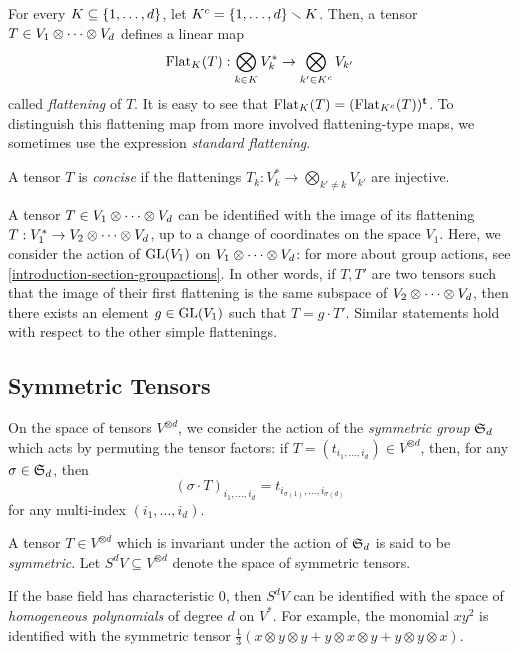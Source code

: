 \begin{definition}[Flattenings]
\label{introduction-definition-flattenings}
For every $K \subseteq \{1 , \ldots , d\}$, let $K^c = \{1, \ldots , d\} \smallsetminus K$. Then, a tensor $T \in V_1 \otimes \cdots \otimes V_d$ defines a linear map 
\[
    \mathrm{Flat}_K(T): \bigotimes_{k \in K} V_{k}^* \to  \bigotimes_{k' \in K^c} V_{k'}
\]
called \emph{flattening} of $T$. It is easy to see that $\mathrm{Flat}_K(T) = (\mathrm{Flat}_{K^c}(T))^{\mathbf{t}}$. To distinguish this flattening map from more involved flattening-type maps, we sometimes use the expression \emph{standard flattening}.
\end{definition}

\begin{definition}
\label{introduction-definition-concise}
A tensor $T$ is \emph{concise} if the flattenings $T_k : V_k^* \to \bigotimes_{k' \neq k} V_{k'}$ are injective. 
\end{definition}

A tensor $T \in V_1 \otimes \cdots \otimes V_d$ can be identified with the image of its flattening $T : V_1^* \to V_2 \otimes \cdots \otimes V_d$, up to a change of coordinates on the space $V_1$. Here, we consider the action of $\mathrm{GL}(V_1)$ on $V_1 \otimes \cdots \otimes V_d$: for more about group actions, see \ref{introduction-section-groupactions}. In other words, if $T,T'$ are two tensors such that the image of their first flattening is the same subspace of $V_2 \otimes \cdots \otimes V_d$, then there exists an element $g \in \mathrm{GL}(V_1)$ such that $T = g\cdot T'$. Similar statements hold with respect to the other simple flattenings.

\subsection{Symmetric Tensors}
\label{introduction-subsection-symmetric_tensors}

On the space of tensors $V^{\otimes d}$, we consider the action of the \emph{symmetric group} $\mathfrak{S}_d$ which acts by permuting the tensor factors: if $T = (t_{i_1,\ldots,i_d}) \in V^{\otimes d}$, then, for any $\sigma \in \mathfrak{S}_d$, then \[(\sigma \cdot T)_{i_1,\ldots,i_d} = t_{i_{\sigma(1)},\ldots,i_{\sigma(d)}}\] for any multi-index $(i_1,\ldots,i_d)$. 
\begin{definition}
\label{introduction-definition-symmetric_tensors}
A tensor $T \in V^{\otimes d}$ which is invariant under the action of $\mathfrak{S}_d$ is said to be \emph{symmetric}. Let $S^d V \subseteq V^{\otimes d}$ denote the space of symmetric tensors. 

If the base field has characteristic $0$, then $S^d V$ can be identified with the space of \emph{homogeneous polynomials} of degree $d$ on $V^*$. For example, the monomial $xy^2$ is identified with the symmetric tensor $\frac{1}{3}\left(x\otimes y \otimes y + y\otimes x \otimes y + y\otimes y \otimes x\right)$.
\end{definition}

